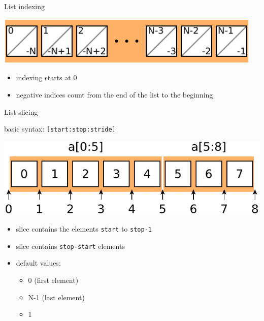 \documentclass{beamer}
\begin{document}
\begin{frame}{List indexing}
 \begin{center}
  \includegraphics[width=0.96\textwidth]{listindexing2}
 \end{center}
 \begin{itemize}
  \item indexing starts at 0
  \item negative indices count from the end of the list to the beginning
 \end{itemize}
\end{frame}

\begin{frame}{List slicing}

 basic syntax: \texttt{[start:stop:stride]}

 \vspace{0.2truecm}
 \begin{center}
  \includegraphics[width=\textwidth]{listindexing1}
 \end{center}
 \begin{itemize}
  \item slice contains the elements \texttt{start} to \texttt{stop-1}
  \item slice contains \texttt{stop-start} elements
  \item default values:
  \begin{itemize}
      \item {} 0 (first element)
      \item {} N-1 (last element)
      \item {} 1
  \end{itemize}
 \end{itemize}
\end{frame}
\end{document}
